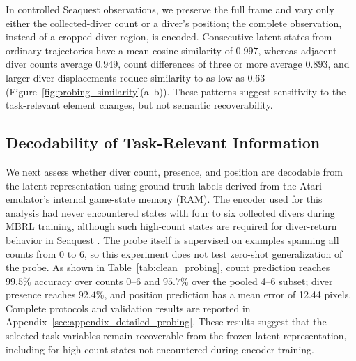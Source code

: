 \documentclass{article} %
\begin{document}
In controlled Seaquest observations, we preserve the full frame and vary only either the collected-diver count or a diver's position; the complete observation, instead of a cropped diver region, is encoded. Consecutive latent states from ordinary trajectories have a mean cosine similarity of $0.997$, whereas adjacent diver counts average $0.949$, count differences of three or more average $0.893$, and larger diver displacements reduce similarity to as low as $0.63$ (Figure~\ref{fig:probing_similarity}(a--b)). These patterns suggest sensitivity to the task-relevant element changes, but not semantic recoverability.



\subsection{Decodability of Task-Relevant Information}
\label{subsec:probing_latent}

We next assess whether diver count, presence, and position are decodable from the latent representation using ground-truth labels derived from the Atari emulator's internal game-state memory (RAM). The encoder used for this analysis had never encountered states with four to six collected divers during MBRL training, although such high-count states are required for diver-return behavior in Seaquest \citep{zahavy2016graying}. The probe itself is supervised on examples spanning all counts from 0 to 6, so this experiment does not test zero-shot generalization of the probe. As shown in Table~\ref{tab:clean_probing}, count prediction reaches $99.5\%$ accuracy over counts 0--6 and $95.7\%$ over the pooled 4--6 subset; diver presence reaches $92.4\%$, and position prediction has a mean error of 12.44 pixels. Complete protocols and validation results are reported in Appendix~\ref{sec:appendix_detailed_probing}.
These results suggest that the selected task variables remain recoverable from the frozen latent representation, including for high-count states not encountered during encoder training.

\end{document}
